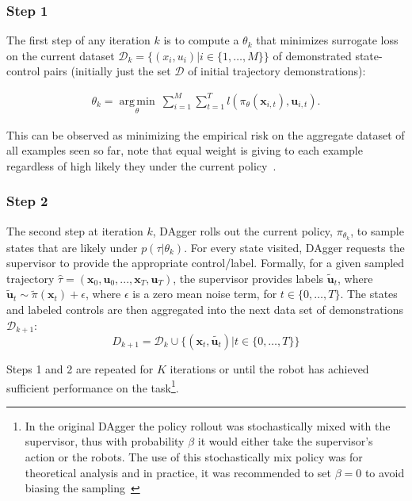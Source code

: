 \documentclass[10pt, conference]{ieeeconf}      %
\DeclareMathOperator*{\argmin}{arg\,min}
\newcommand{\bu}{\mathbf{u}}
\newcommand{\bx}{\mathbf{x}}
\begin{document}
\subsubsection{Step 1}
The first step of any iteration $k$ is to compute a $\theta_k$ that minimizes surrogate loss on the current dataset $\mathcal{D}_k=\{(x_i,u_i)|i\in\{1,\ldots,M\}\}$ of demonstrated state-control pairs (initially just the set $\mathcal{D}$ of initial trajectory demonstrations):

 \vspace{-1ex}
\begin{align}\label{eq:super_objj}
\theta_{k} = \underset{\theta}{\argmin} \: \sum_{i=1}^{M} \sum_{t=1}^T  l(\pi_{\theta}(\bx_{i,t}),\bu_{i,t}).
\end{align}

This can be observed as minimizing the empirical risk on the aggregate dataset of all examples seen so far, note that equal weight is giving to each example regardless of high likely they under the current policy~\cite{scholkopf2002learning}. 
 

 \subsubsection{Step 2}
The second step at iteration $k$, DAgger rolls out the current policy, $\pi_{\theta_{k}}$, to sample states that are likely under $p(\tau|\theta_{k})$.  For every state visited, DAgger requests the supervisor to provide the appropriate control/label. Formally, for a given sampled trajectory  $\hat{\tau} = (\bx_0,\bu_0,...,\bx_T,\bu_T )$, the supervisor provides labels $\tilde{\bu}_t$, where $\tilde{\bu}_t \sim \tilde{\pi}(\bx_t) + \epsilon$, where $\epsilon$ is a  zero mean noise term, for $t\in \{0, \ldots, T\}$.
The states and labeled controls are then aggregated into the next data set of demonstrations $\mathcal{D}_{k+1}$:
$$D_{k+1}=\mathcal{D}_k \cup \{(\bx_t,\tilde{\bu_t})|t\in\{0,\ldots,T\}\} $$

Steps 1 and 2 are repeated for $K$ iterations or until the robot has achieved sufficient performance on the
task\footnote{In the original DAgger the policy rollout was stochastically mixed with the supervisor, thus with
    probability $\beta$ it would either take the supervisor's action or the robots. The use of this stochastically mix
    policy was for theoretical analysis and in practice, it was recommended to set $\beta = 0$ to avoid biasing the
sampling~\cite{NIPS2014_5421,ross2010reduction}}.
\end{document}
